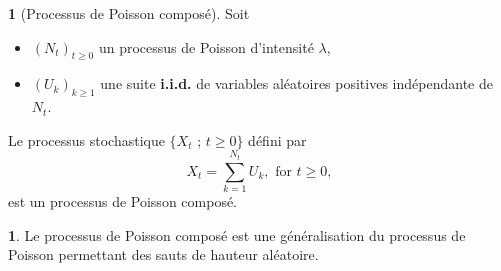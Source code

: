\documentclass[8pt,notheorems]{beamer}
\theoremstyle{definition}
\newtheorem{definition}{\translate{Definition}}
\theoremstyle{example}
\theoremstyle{mystyle}
\newtheorem{remark}{\translate{Remarque}}
\theoremstyle{plain}
\begin{document}
\begin{frame}[allowframebreaks]
\begin{definition}[Processus de Poisson composé]
Soit
\begin{itemize}
\item $(N_t)_{t\geq0}$ un processus de Poisson d'intensité $\lambda$,
\item $(U_k)_{k\geq1}$ une suite \textbf{i.i.d.} de variables aléatoires positives indépendante de $N_t$.
\end{itemize}
Le processus stochastique $\{X_t\text{ ; }t\geq0\}$ défini par
\begin{equation*}
X_t=\sum_{k=1}^{N_t}U_k,\text{ for }t\geq0,
\end{equation*}
est un processus de Poisson composé.
\end{definition}
\begin{remark}
Le processus de Poisson composé est une généralisation du processus de Poisson permettant des sauts de hauteur aléatoire.
\end{remark}
\end{frame}
\end{document}
